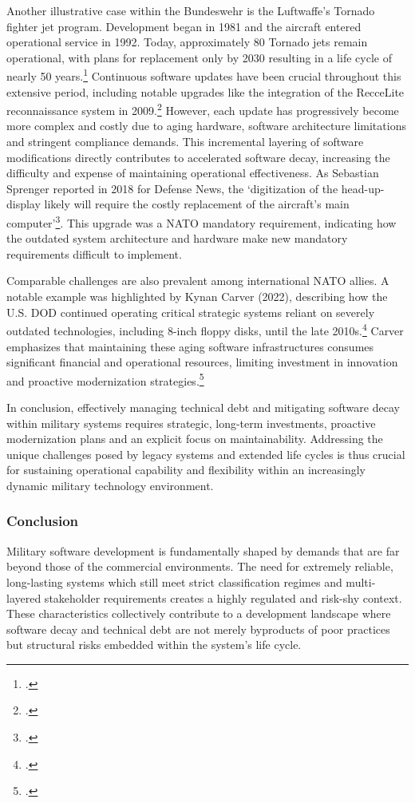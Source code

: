 Another illustrative case within the Bundeswehr is the Luftwaffe's Tornado fighter jet program. Development began in 1981 and the aircraft entered operational service in 1992. Today, approximately 80 Tornado jets remain operational, with plans for 
replacement only by 2030 resulting in a life cycle of nearly 50 years.\footcite[no page number]{skibaTornado50Jahre2024} Continuous software updates have been crucial throughout this extensive period, including notable upgrades like the integration of the RecceLite reconnaissance system in 2009.\footcite[no page number]{bundeswehrTornado} However, 
each update has progressively become more complex and costly due to aging hardware, software architecture limitations and stringent compliance demands. This incremental layering of software modifications directly contributes to accelerated software decay, increasing the difficulty and expense of maintaining operational effectiveness.
As Sebastian Sprenger reported in 2018 for Defense News, the `digitization of the head-up-display likely will require the costly replacement of the aircraft’s main computer'\footcite[no page number]{sprengerGermanyFearsSteeper2018}. This upgrade was a NATO mandatory requirement, indicating how the outdated system architecture and hardware make new mandatory requirements difficult to implement. 

Comparable challenges are also prevalent among international NATO allies. A notable example was highlighted by Kynan Carver (2022), describing how the U.S. \ac{DOD} continued operating critical strategic systems reliant on severely outdated technologies, 
including 8-inch floppy disks, until the late 2010s.\footcite[no page number]{carverTechnicalDebtCybersecurity2022} Carver emphasizes that maintaining these aging software infrastructures consumes significant financial and operational resources, limiting investment in innovation and proactive modernization strategies.\footcite[no page number]{carverTechnicalDebtCybersecurity2022}

In conclusion, effectively managing technical debt and mitigating software decay within military systems requires strategic, long-term investments, proactive modernization plans and an explicit focus on maintainability. Addressing the unique challenges posed by legacy 
systems and extended life cycles is thus crucial for sustaining operational capability and flexibility within an increasingly dynamic military technology environment.

\subsubsection{Conclusion}
Military software development is fundamentally shaped by demands that are far beyond those of the commercial environments. The need for extremely reliable, long-lasting systems which still meet strict classification regimes and multi-layered stakeholder requirements creates a highly regulated and risk-shy context.
These characteristics collectively contribute to a development landscape where software decay and technical debt are not merely byproducts of poor practices but structural risks embedded within the system's life cycle.

